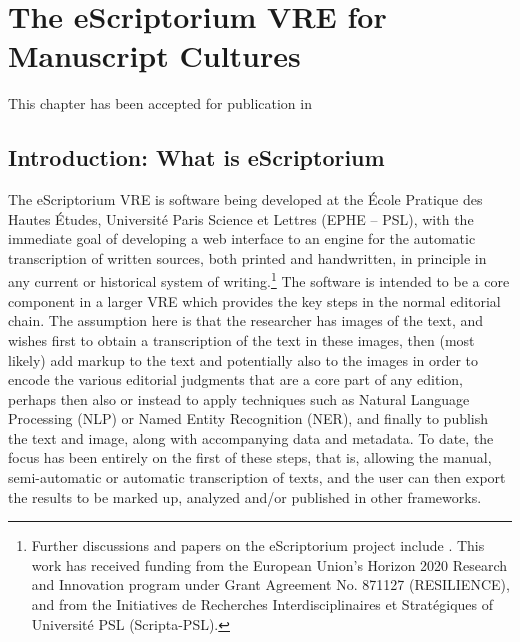 ﻿\chapter{The eScriptorium VRE for Manuscript Cultures}
\thispagestyle{empty}
\vfill
This chapter has been accepted for publication in 
\newpage

\section{Introduction: What is eScriptorium}

The eScriptorium VRE is software being developed at the École Pratique des
Hautes Études, Université Paris Science et Lettres (EPHE – PSL), with the
immediate goal of developing a web interface to an engine for the automatic
transcription of written sources, both printed and handwritten, in principle in
any current or historical system of writing.\footnote{Further discussions and
papers on the eScriptorium project include
\cite{kiessling2019kraken,KiesslingEtAl2019eScrip, kiessling2019badam,
stokes2020escriptorium}. This work has received funding from the European
Union’s Horizon 2020 Research and Innovation program under Grant Agreement No.
871127 (RESILIENCE), and from the Initiatives de Recherches Interdisciplinaires
et Stratégiques of Université PSL (Scripta-PSL).} The software is intended to
be a core component in a larger VRE which provides the key steps in the normal
editorial chain. The assumption here is that the researcher has images of the
text, and wishes first to obtain a transcription of the text in these images,
then (most likely) add markup to the text and potentially also to the images in
order to encode the various editorial judgments that are a core part of any
edition, perhaps then also or instead to apply techniques such as Natural
Language Processing (NLP) or Named Entity Recognition (NER), and finally to
publish the text and image, along with accompanying data and metadata. To date,
the focus has been entirely on the first of these steps, that is, allowing the
manual, semi-automatic or automatic transcription of texts, and the user can
then export the results to be marked up, analyzed and/or published in other
frameworks.

